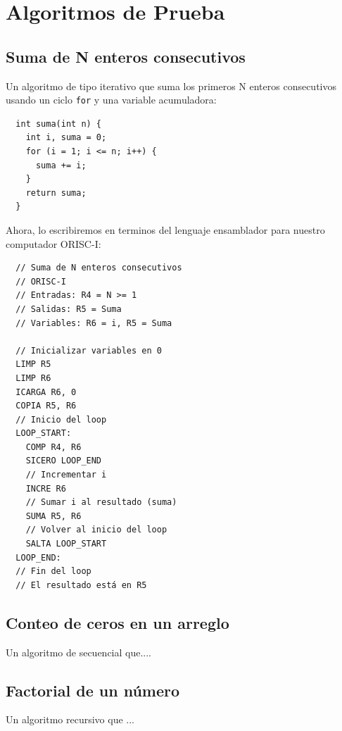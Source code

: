 \documentclass{article}
\begin{document}

\section{Algoritmos de Prueba}

\subsection{Suma de N enteros consecutivos}

Un algoritmo de tipo iterativo que suma los primeros N enteros
consecutivos usando un ciclo \texttt{for} y una variable acumuladora:

\begin{verbatim}
  int suma(int n) {
    int i, suma = 0;
    for (i = 1; i <= n; i++) {
      suma += i;
    }
    return suma;
  }
\end{verbatim}

Ahora, lo escribiremos en terminos del lenguaje ensamblador para nuestro computador ORISC-I:

\begin{verbatim}
  // Suma de N enteros consecutivos
  // ORISC-I
  // Entradas: R4 = N >= 1
  // Salidas: R5 = Suma
  // Variables: R6 = i, R5 = Suma

  // Inicializar variables en 0
  LIMP R5
  LIMP R6
  ICARGA R6, 0
  COPIA R5, R6
  // Inicio del loop
  LOOP_START:
    COMP R4, R6
    SICERO LOOP_END
    // Incrementar i
    INCRE R6
    // Sumar i al resultado (suma)
    SUMA R5, R6
    // Volver al inicio del loop
    SALTA LOOP_START
  LOOP_END:
  // Fin del loop
  // El resultado está en R5
\end{verbatim}

\subsection{Conteo de ceros en un arreglo}

Un algoritmo de secuencial que....

\subsection{Factorial de un número}

Un algoritmo recursivo que ...
\end{document}
